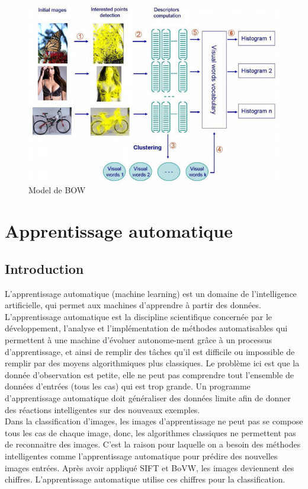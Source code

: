 \begin{figure}[ht!]
\centering
\includegraphics[width=160mm]{images/bow}
\caption{Model de BOW \cite{nk13}}
\label{overflow}
\end{figure}

\chapter{Apprentissage automatique}
\label{chap:sgd}

\section{Introduction}
L'apprentissage automatique (machine learning) est un domaine de l'intelligence artificielle, qui permet aux machines d'apprendre à partir des données. L'apprentissage automatique est la discipline scientifique concernée par le développement, l'analyse et l'implémentation de méthodes automatisables qui permettent à une machine d'évoluer autonome-ment grâce à un processus d'apprentissage, et ainsi de remplir des tâches qu'il est difficile ou impossible de remplir par des moyens algorithmiques plus classiques. Le problème ici est que la donnée d'observation est petite, elle ne peut pas comprendre tout l'ensemble de données d'entrées (tous les cas) qui est trop grande. Un programme d'apprentissage automatique doit généraliser des données limite afin de donner des réactions intelligentes sur des nouveaux exemples.\\

Dans la classification d'images, les images d'apprentissage ne peut pas se compose tous les cas de chaque image, donc, les algorithmes classiques ne permettent pas de reconnaitre des images. C'est la raison pour laquelle on a besoin des méthodes intelligentes comme l'apprentissage automatique pour prédire des nouvelles images entrées. Après avoir appliqué SIFT et BoVW, les images deviennent des chiffres. L'apprentissage automatique utilise ces chiffres pour la classification.

